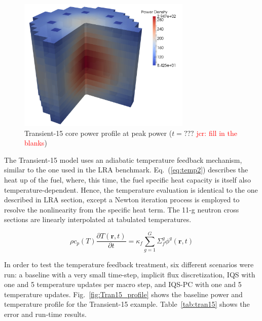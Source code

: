 \documentclass{elsarticle}
\renewcommand{\vec}[1]{\bm{#1}} %
\newcommand{\eqt}[1]{Eq.~(\ref{#1})}                     %
\newcommand{\fig}[1]{Fig.~\ref{#1}}                      %
\newcommand{\tbl}[1]{Table~\ref{#1}}                     %
\newcommand{\iqspc}{IQS-PC\xspace}
\newcommand{\be}{\begin{equation}}
\newcommand{\ee}{\end{equation}}
\newcommand{\jcr}[1]{\textcolor{red}{jcr: #1}}
\begin{document}
\begin{figure}[htbp!]
\centering
\includegraphics[height=2.5in]{figures/Tran15_core2.png}
\caption{Transient-15 core power profile at peak power ($t=???$ \jcr{fill in the blanks})}
\label{fig:Tran15}
\end{figure}

The Transient-15 model uses an adiabatic temperature feedback mechanism, similar to the one used in the LRA benchmark.
\eqt{eq:temp2} describes the heat up of the fuel, where, this time, the fuel specific heat capacity is itself also temperature-dependent. Hence, the temperature evaluation is identical to the one described in LRA section, except a Newton iteration process is employed to resolve the nonlinearity from the specific heat term.  The 11-g neutron cross sections are linearly interpolated at tabulated temperatures.

\be
\rho c_p(T) \frac{\partial T(\vec{r},t)}{\partial t} = \kappa_f \sum^G_{g=1}\Sigma_f^g \phi^g(\vec{r},t)
\label{eq:temp2}
\ee



In order to test the temperature feedback treatment, six different scenarios were run: a baseline with a very small time-step, implicit flux discretization, IQS with one and 5 temperature updates per macro step, and \iqspc with one and 5 temperature updates.  \fig{fig:Tran15_profile} shows the baseline power and temperature profile for the Transient-15 example.  \tbl{tab:tran15} shows the error and run-time results.
\end{document}
